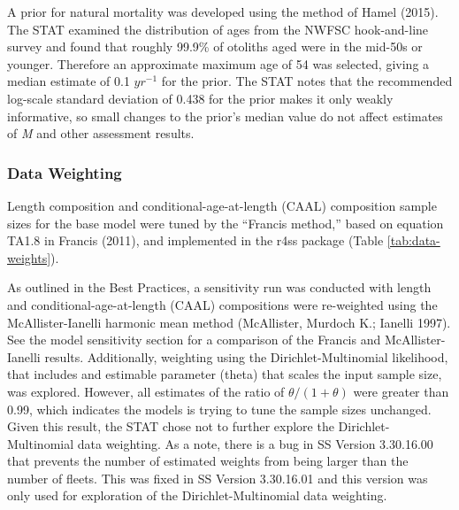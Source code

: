 \documentclass[11pt,
  english,
]{article}
\begin{document}
A prior for natural mortality was developed using the method of Hamel {(2015)\leavevmode\tagmcend\tagstructend}. The STAT examined the distribution of ages from the NWFSC hook-and-line survey and found that roughly 99.9\% of otoliths aged were in the mid-50s or younger. Therefore an approximate maximum age of 54 was selected, giving a median estimate of 0.1 {\(yr^{-1}\)\leavevmode\tagmcend\tagstructend} for the prior. The STAT notes that the recommended log-scale standard deviation of 0.438 for the prior makes it only weakly informative, so small changes to the prior's median value do not affect estimates of \emph{M} and other assessment results.


\hypertarget{data-weighting}{%
\subsubsection{Data Weighting}\label{data-weighting}}

\leavevmode\tagmcend\tagstructend

Length composition and conditional-age-at-length (CAAL) composition sample sizes for the base model were tuned by the ``Francis method,'' based on equation TA1.8 in Francis {(2011)\leavevmode\tagmcend\tagstructend}, and implemented in the r4ss package (Table \ref{tab:data-weights}).

As outlined in the Best Practices, a sensitivity run was conducted with length and conditional-age-at-length (CAAL) compositions were re-weighted using the McAllister-Ianelli harmonic mean method {(McAllister, Murdoch K.; Ianelli 1997)\leavevmode\tagmcend\tagstructend}. See the model sensitivity section for a comparison of the Francis and McAllister-Ianelli results. Additionally, weighting using the Dirichlet-Multinomial likelihood, that includes and estimable parameter (theta) that scales the input sample size, was explored. However, all estimates of the ratio of {\(\theta/(1+\theta)\)\leavevmode\tagmcend\tagstructend} were greater than 0.99, which indicates the models is trying to tune the sample sizes unchanged. Given this result, the STAT chose not to further explore the Dirichlet-Multinomial data weighting. As a note, there is a bug in SS Version 3.30.16.00 that prevents the number of estimated weights from being larger than the number of fleets. This was fixed in SS Version 3.30.16.01 and this version was only used for exploration of the Dirichlet-Multinomial data weighting.
\end{document}
